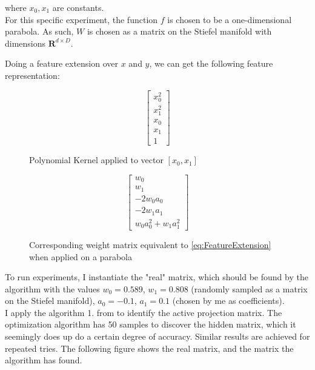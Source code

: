 where $x_0, x_1$ are constants. \\

For this specific experiment, the function $f$ is chosen to be a one-dimensional parabola. 
As such, $W$ is chosen as a matrix on the Stiefel manifold with dimensions $\mathbf{R}^{d \times D}$.

Doing a feature extension over $x$ and $y$, we can get the following feature representation:

\def\PHI{
\begin{bmatrix}
    x_0^2 \\
    x_1^2 \\
    x_0 \\
    x_1 \\
    1
\end{bmatrix}}


\def\WtoPhi{
\begin{bmatrix}
    w_0 \\
    w_1 \\
    -2 w_0 a_0 \\
    -2 w_1 a_1 \\
    w_0 a_0^2 + w_1 a_1^2
\end{bmatrix}}

\begin{figure}[h]

\begin {minipage}{0.47\textwidth}
  \centering
  \begin{equation}
    \PHI
  \end{equation}
  \caption{Polynomial Kernel applied to vector $[x_0, x_1]$}
\end{minipage}
\hfill
\begin {minipage}{0.47\textwidth}
  \centering
  \begin{equation}
    \WtoPhi
  \end{equation}
  \caption{Corresponding weight matrix equivalent to \ref{eq:FeatureExtension} when applied on a parabola}
\end{minipage}

\end{figure}

To run experiments, I instantiate the "real" matrix, which should be found by the algorithm with the values $w_0 = 0.589$, $w_1 = 0.808$ (randomly sampled as a matrix on the Stiefel manifold), $a_0 = -0.1$, $a_1 = 0.1$ (chosen by me as coefficients). \\

I apply the algorithm 1. from \citep{Tripathy} to identify the active projection matrix.
The optimization algorithm has 50 samples to discover the hidden matrix, which it seemingly does up do a certain degree of accuracy.
Similar results are achieved for repeated tries.
The following figure shows the real matrix, and the matrix the algorithm has found.

